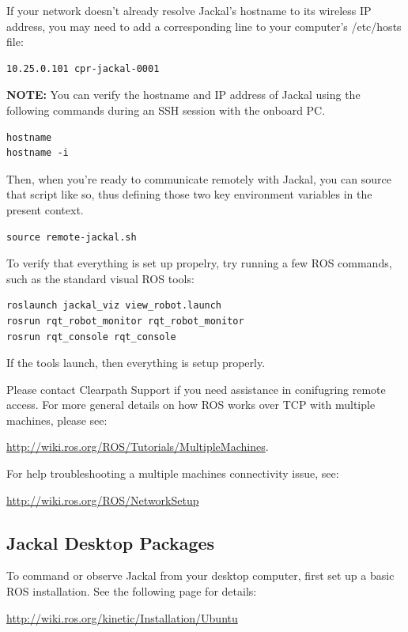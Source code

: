 \documentclass[]{clearpath-latex/clearpath-manual}
\begin{document}
If your network doesn’t already resolve Jackal’s hostname to its wireless IP address, you may need to add a corresponding line to your computer’s /etc/hosts file:

\begin{lstlisting}
10.25.0.101 cpr-jackal-0001
\end{lstlisting}

\textbf{NOTE:} You can verify the hostname and IP address of Jackal using the following commands during an SSH session with the onboard PC.

\begin{lstlisting}
hostname
hostname -i
\end{lstlisting}

Then, when you’re ready to communicate remotely with Jackal, you can source that script like so, thus defining those two key environment variables in the present context.

\begin{lstlisting}
source remote-jackal.sh
\end{lstlisting}

To verify that everything is set up propelry, try running a few ROS commands, such as the standard visual ROS tools:

\begin{lstlisting}
roslaunch jackal_viz view_robot.launch
rosrun rqt_robot_monitor rqt_robot_monitor
rosrun rqt_console rqt_console
\end{lstlisting}

If the tools launch, then everything is setup properly.

Please contact Clearpath Support if you need assistance in conifugring remote access. For more general details on how ROS works over TCP with multiple machines, please see:

\url{http://wiki.ros.org/ROS/Tutorials/MultipleMachines}.

For help troubleshooting a multiple machines connectivity issue, see:

\url{http://wiki.ros.org/ROS/NetworkSetup}

\newpage\subsection{Jackal Desktop Packages}

To command or observe Jackal from your desktop computer, first set up a basic
ROS installation. See the following page for details:

\url{http://wiki.ros.org/kinetic/Installation/Ubuntu}
\end{document}
